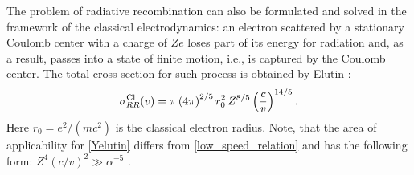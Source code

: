\documentclass{SovJurn/JETPL}
\begin{document}
The problem of radiative recombination can also be formulated and solved in the framework of the classical electrodynamics: an electron scattered by a stationary Coulomb center with a charge of $Ze$ loses part of its energy for radiation and, as a result, passes into a state of finite motion, i.e., is captured by the Coulomb center. The total cross section for such process is obtained by Elutin \cite{elutin}: 
\begin{equation}
\sigma^{\rm Cl}_{RR}(v)=\pi\left(4\pi\right)^{2/5}r^2_0\, Z^{8/5}\left(\frac{c}{v}\right)^{14/5}.
\label{Yelutin}
\end{equation}
Нere $r_0=e^2/(mc^2)$ is the classical electron radius. Note, that the area of applicability for \eqref{Yelutin} differs from \eqref{low_speed_relation} and has the following form: $Z^4(c/v)^2\gg\alpha^{-5}$ \cite{elutin,belotsky2020problems}.
\end{document}
